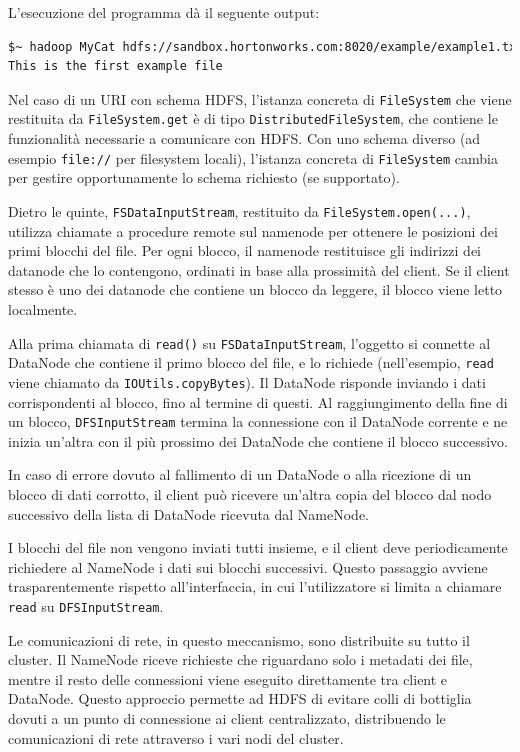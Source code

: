 \documentclass[italian,a4paper, twoside, 12pt]{report}
\begin{document}
L'esecuzione del programma dà il seguente output:

\begin{lstlisting}[language=sh]
$~ hadoop MyCat hdfs://sandbox.hortonworks.com:8020/example/example1.txt
This is the first example file
\end{lstlisting}

Nel caso di un URI con schema HDFS, l'istanza concreta di
\lstinline!FileSystem! che viene restituita da
\lstinline!FileSystem.get! è di tipo \lstinline!DistributedFileSystem!,
che contiene le funzionalità necessarie a comunicare con HDFS. Con uno
schema diverso (ad esempio \lstinline!file://! per filesystem locali),
l'istanza concreta di \lstinline!FileSystem! cambia per gestire
opportunamente lo schema richiesto (se supportato).

Dietro le quinte, \lstinline!FSDataInputStream!, restituito da
\lstinline!FileSystem.open(...)!, utilizza chiamate a procedure remote
sul namenode per ottenere le posizioni dei primi blocchi del file. Per
ogni blocco, il namenode restituisce gli indirizzi dei datanode che lo
contengono, ordinati in base alla prossimità del client. Se il client
stesso è uno dei datanode che contiene un blocco da leggere, il blocco
viene letto localmente.

Alla prima chiamata di \lstinline!read()! su
\lstinline!FSDataInputStream!, l'oggetto si connette al DataNode che
contiene il primo blocco del file, e lo richiede (nell'esempio,
\lstinline!read! viene chiamato da \lstinline!IOUtils.copyBytes!). Il
DataNode risponde inviando i dati corrispondenti al blocco, fino al
termine di questi. Al raggiungimento della fine di un blocco,
\lstinline!DFSInputStream! termina la connessione con il DataNode
corrente e ne inizia un'altra con il più prossimo dei DataNode che
contiene il blocco successivo.

In caso di errore dovuto al fallimento di un DataNode o alla ricezione
di un blocco di dati corrotto, il client può ricevere un'altra copia del
blocco dal nodo successivo della lista di DataNode ricevuta dal
NameNode.

I blocchi del file non vengono inviati tutti insieme, e il client deve
periodicamente richiedere al NameNode i dati sui blocchi successivi.
Questo passaggio avviene trasparentemente rispetto all'interfaccia, in
cui l'utilizzatore si limita a chiamare \lstinline!read! su
\lstinline!DFSInputStream!.

Le comunicazioni di rete, in questo meccanismo, sono distribuite su
tutto il cluster. Il NameNode riceve richieste che riguardano solo i
metadati dei file, mentre il resto delle connessioni viene eseguito
direttamente tra client e DataNode. Questo approccio permette ad HDFS di
evitare colli di bottiglia dovuti a un punto di connessione ai client
centralizzato, distribuendo le comunicazioni di rete attraverso i vari
nodi del cluster.
\end{document}

